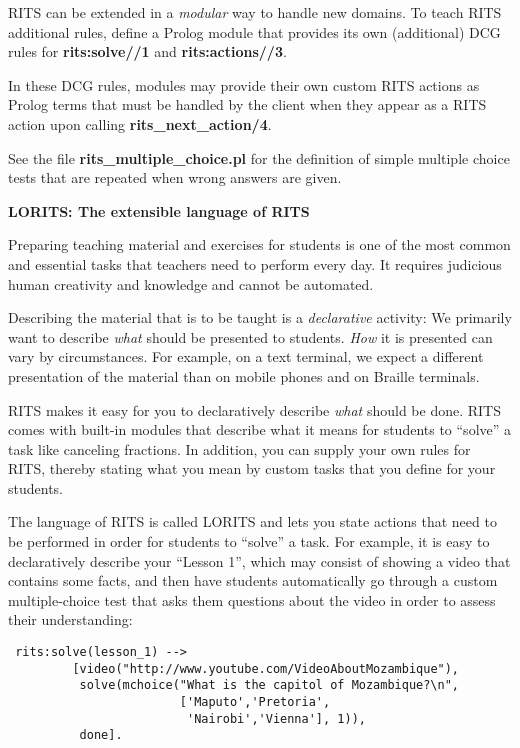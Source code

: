 \documentclass[a4paper,11pt]{article}
\begin{document}
RITS can be extended in a \textit{modular} way to handle new domains.
To teach RITS additional rules, define a Prolog module that provides
its own (additional) DCG rules for \textbf{rits:solve//1} and
\textbf{rits:actions//3}. 

In these DCG rules, modules may provide their own custom RITS actions
as Prolog terms that must be handled by the client when they appear as
a RITS action upon calling \textbf{rits\_next\_action/4}.

See the file \textbf{rits\_multiple\_choice.pl} for the definition of
simple multiple choice tests that are repeated when wrong answers are
given.

\bigskip
\begin{center}
  \large\textbf{LORITS: The extensible language of RITS}
\end{center}

\medskip
\noindent
Preparing teaching material and exercises for students is one of the
most common and essential tasks that teachers need to perform
every day. It requires judicious human creativity and knowledge and
cannot be automated.

Describing the material that is to be taught is a \textit{declarative}
activity: We primarily want to describe \textit{what} should be
presented to students. \textit{How} it is presented can vary by
circumstances. For example, on a text terminal, we expect a different
presentation of the material than on mobile phones and on Braille
terminals.

RITS makes it easy for you to declaratively describe \textit{what}
should be done. RITS comes with built-in modules that describe what it
means for students to ``solve'' a task like canceling fractions. In
addition, you can supply your own rules for RITS, thereby stating what
you mean by custom tasks that you define for your students.

The language of RITS is called LORITS and lets you state actions that
need to be performed in order for students to ``solve'' a task. For
example, it is easy to declaratively describe your ``Lesson 1'', which
may consist of showing a video that contains some facts, and then have
students automatically go through a custom multiple-choice test that
asks them questions about the video in order to assess their
understanding:

\begin{verbatim}
 rits:solve(lesson_1) -->
         [video("http://www.youtube.com/VideoAboutMozambique"),
          solve(mchoice("What is the capitol of Mozambique?\n",
                        ['Maputo','Pretoria',
                         'Nairobi','Vienna'], 1)),
          done].
\end{verbatim}
\end{document}
